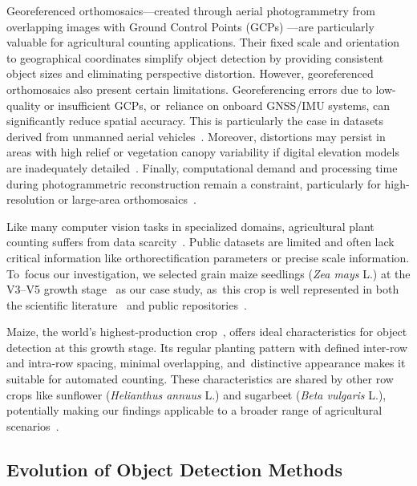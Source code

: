 \documentclass[12pt,a4paper,oneside]{report}
\begin{document}
Georeferenced orthomosaics—created through aerial photogrammetry from overlapping
images with Ground Control Points (GCPs) \cite{krausPhotogrammetryGeometryImages2011}—are 
particularly valuable for agricultural counting applications. Their fixed scale and
orientation to geographical coordinates simplify object detection by providing
consistent object sizes and eliminating perspective distortion.
However, georeferenced orthomosaics also present certain limitations. Georeferencing 
errors due to low-quality or insufficient GCPs, or~reliance on onboard GNSS/IMU 
systems, can significantly reduce spatial accuracy.
This is particularly the case in datasets derived from unmanned aerial vehicles~\cite{pugh_comparison_2021,dhonju_web_2023}. Moreover, 
distortions may persist in areas with high relief or vegetation canopy variability 
if digital elevation models are inadequately detailed~\cite{habib_automated_2016,de_petris_rpas-based_2020}. 
Finally, computational demand and processing time during photogrammetric reconstruction 
remain a constraint, particularly for high-resolution or large-area orthomosaics~\cite{zhang_georeferencing_2022}.

Like many computer vision tasks in specialized domains, agricultural plant counting
suffers from data scarcity~\cite{farjon_deep-learning-based_2023}. 
Public datasets are limited and often lack critical 
information like orthorectification parameters or precise scale information. To~focus
our investigation, we selected grain maize seedlings ({\em Zea mays} L.) at the V3--V5 
growth stage~\cite{meierBBCHSystemCoding2009} as our case study, as~this crop is well
represented in both the scientific literature~\cite{davidPlantDetectionCounting2021,
liuIntegrateNetDeepLearning2022} and public repositories~\cite{Maize_seedingDatasetOverview,
MaizeseedlingdetectionDatasetOverview}.

Maize, the world's highest-production crop~\cite{fao2024}, offers ideal characteristics
for object detection at this growth stage. Its regular planting pattern with defined
inter-row and intra-row spacing, minimal overlapping, and~distinctive appearance makes
it suitable for automated counting. These characteristics are shared by other row crops
like sunflower ({\em Helianthus annuus} L.) and sugarbeet ({\em Beta vulgaris} L.), potentially
making our findings applicable to a broader range of agricultural scenarios~\cite{torres-sanchez_early_2021}.

\subsection{Evolution of Object Detection Methods}
\end{document}
